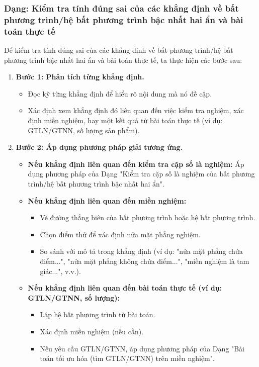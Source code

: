\subsubsection{Dạng: Kiểm tra tính đúng sai của các khẳng định về bất phương trình/hệ bất phương trình bậc nhất hai ẩn và bài toán thực tế}
\begin{phuongphap}
Để kiểm tra tính đúng sai của các khẳng định về bất phương trình/hệ bất phương trình bậc nhất hai ẩn và bài toán thực tế, ta thực hiện các bước sau:
\begin{enumerate}
    \item \textbf{Bước 1: Phân tích từng khẳng định.}
    \begin{itemize}
        \item Đọc kỹ từng khẳng định để hiểu rõ nội dung mà nó đề cập.
        \item Xác định xem khẳng định đó liên quan đến việc kiểm tra nghiệm, xác định miền nghiệm, hay một kết quả từ bài toán thực tế (ví dụ: GTLN/GTNN, số lượng sản phẩm).
    \end{itemize}
    \item \textbf{Bước 2: Áp dụng phương pháp giải tương ứng.}
    \begin{itemize}
        \item \textbf{Nếu khẳng định liên quan đến kiểm tra cặp số là nghiệm:} Áp dụng phương pháp của Dạng "Kiểm tra cặp số là nghiệm của bất phương trình/hệ bất phương trình bậc nhất hai ẩn".
        \item \textbf{Nếu khẳng định liên quan đến miền nghiệm:}
        \begin{itemize}
            \item Vẽ đường thẳng biên của bất phương trình hoặc hệ bất phương trình.
            \item Chọn điểm thử để xác định nửa mặt phẳng nghiệm.
            \item So sánh với mô tả trong khẳng định (ví dụ: "nửa mặt phẳng chứa điểm...", "nửa mặt phẳng không chứa điểm...", "miền nghiệm là tam giác...", v.v.).
        \end{itemize}
        \item \textbf{Nếu khẳng định liên quan đến bài toán thực tế (ví dụ: GTLN/GTNN, số lượng):}
        \begin{itemize}
            \item Lập hệ bất phương trình từ bài toán.
            \item Xác định miền nghiệm (nếu cần).
            \item Nếu yêu cầu GTLN/GTNN, áp dụng phương pháp của Dạng "Bài toán tối ưu hóa (tìm GTLN/GTNN) trên miền nghiệm".

\end{itemize}
\end{itemize}
\end{enumerate}
\end{phuongphap}

